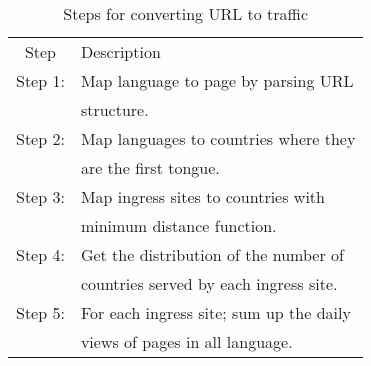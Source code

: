 \begin{table}[!h]
\caption[Steps to convert Raw URL to DC Network Traffic]{Steps for converting URL to traffic} \label{table: url2dc}
\begin{small}
\begin{tabular}{c|l}
\hline \hline
Step & Description \\
Step 1:& Map language to page by parsing URL \\
&structure. \\
\hline
Step 2:& Map languages to countries where they \\
& are the first tongue. \\ 
\hline
Step 3:& Map ingress sites to countries with \\
& minimum distance function. \\
\hline
Step 4:& Get the distribution of the number of \\
& countries served by each ingress site. \\
\hline
Step 5:& For each ingress site; sum up the daily \\
& views of pages in all language. \\
\hline \hline
\end{tabular}
\end{small}
\end{table}